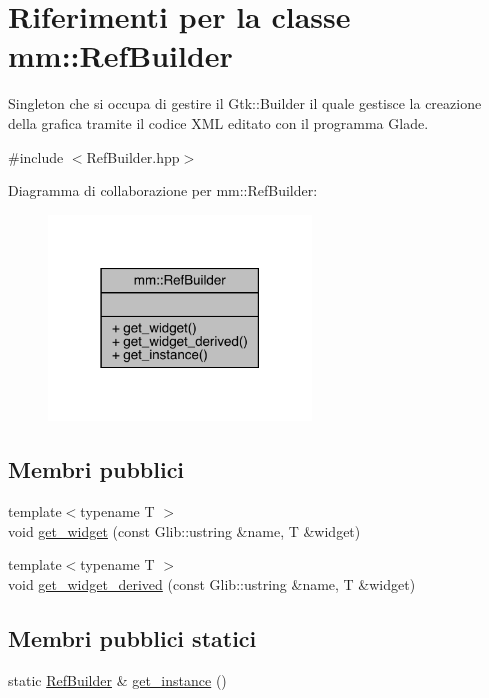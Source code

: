 \hypertarget{classmm_1_1_ref_builder}{}\section{Riferimenti per la classe mm\+:\+:Ref\+Builder}
\label{classmm_1_1_ref_builder}


Singleton che si occupa di gestire il Gtk\+::\+Builder il quale gestisce la creazione della grafica tramite il codice X\+ML editato con il programma Glade.  




{\ttfamily \#include $<$Ref\+Builder.\+hpp$>$}



Diagramma di collaborazione per mm\+:\+:Ref\+Builder\+:
\nopagebreak
\begin{figure}[H]
\begin{center}
\leavevmode
\includegraphics[width=198pt]{d5/ddf/classmm_1_1_ref_builder__coll__graph}
\end{center}
\end{figure}
\subsection*{Membri pubblici}
\begin{DoxyCompactItemize}
\item 
{\footnotesize template$<$typename T $>$ }\\void \mbox{\hyperlink{classmm_1_1_ref_builder_a67812973516cbeddf488360424685153}{get\+\_\+widget}} (const Glib\+::ustring \&name, T \&widget)
\item 
{\footnotesize template$<$typename T $>$ }\\void \mbox{\hyperlink{classmm_1_1_ref_builder_a428724036811e6b9ecc6c50c42209a74}{get\+\_\+widget\+\_\+derived}} (const Glib\+::ustring \&name, T \&widget)
\end{DoxyCompactItemize}
\subsection*{Membri pubblici statici}
\begin{DoxyCompactItemize}
\item 
static \mbox{\hyperlink{classmm_1_1_ref_builder}{Ref\+Builder}} \& \mbox{\hyperlink{classmm_1_1_ref_builder_a1c46de2b1ff68aebfc85692a99827753}{get\+\_\+instance}} ()
\end{DoxyCompactItemize}


